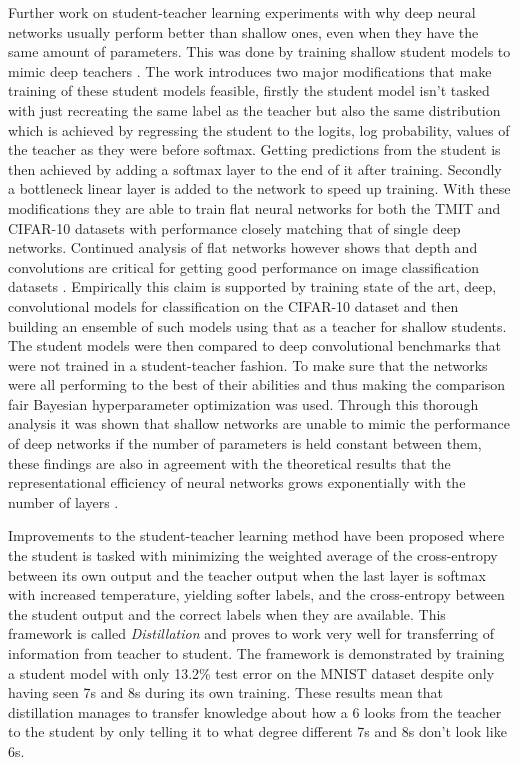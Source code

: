 \documentclass{kththesis}
\newcommand{\bibentry}[1]{\parencite{#1}}
\begin{document}
Further work on student-teacher learning experiments with why deep neural networks usually perform better than shallow ones, even when they have the same amount of parameters. This was done by training shallow student models to mimic deep teachers \bibentry{ba2014deep}. The work introduces two major modifications that make training of these student models feasible, firstly the student model isn't tasked with just recreating the same label as the teacher but also the same distribution which is achieved by regressing the student to the logits, log probability, values of the teacher as they were before softmax. Getting predictions from the student is then achieved by adding a softmax layer to the end of it after training. Secondly a bottleneck linear layer is added to the network to speed up training. With these modifications they are able to train flat neural networks for both the TMIT and CIFAR-10 datasets with performance closely matching that of single deep networks. Continued analysis of flat networks however shows that depth and convolutions are critical for getting good performance on image classification datasets \bibentry{urban2016deep}. Empirically this claim is supported by training state of the art, deep, convolutional models for classification on the CIFAR-10 dataset and then building an ensemble of such models using that as a teacher for shallow students. The student models were then compared to deep convolutional benchmarks that were not trained in a student-teacher fashion. To make sure that the networks were all performing to the best of their abilities and thus making the comparison fair Bayesian hyperparameter optimization \bibentry{snoek2012practical} was used. Through this thorough analysis it was shown that shallow networks are unable to mimic the performance of deep networks if the number of parameters is held constant between them, these findings are also in agreement with the theoretical results that the representational efficiency of neural networks grows exponentially with the number of layers \bibentry{liang2016deep}.

Improvements to the student-teacher learning method have been proposed where the student is tasked with minimizing the weighted average of the cross-entropy between its own output and the teacher output when the last layer is softmax with increased temperature, yielding softer labels, and the cross-entropy between the student output and the correct labels when they are available. This framework is called \emph{Distillation} \bibentry{hinton2015distilling} and proves to work very well for transferring of information from teacher to student. The framework is demonstrated by training a student model with only 13.2\% test error on the MNIST dataset despite only having seen 7s and 8s during its own training. These results mean that distillation manages to transfer knowledge about how a 6 looks from the teacher to the student by only telling it to what degree different 7s and 8s don't look like 6s.
\end{document}
